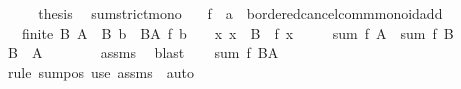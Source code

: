 \begin{isabellebody}
\ \ \isamarkupfalse%
\ \isamarkupfalse%
\ {\isacharquery}{\kern0pt}thesis\ \isacommand{{\isachardot}{\kern0pt}}\isamarkupfalse%
\isanewline
{}\isamarkupfalse%
%
\endisatagproof
{\isafoldproof}%
%
\isadelimproof
\isanewline
%
\endisadelimproof
\isanewline
{}\isamarkupfalse%
\ sum{\isacharunderscore}{\kern0pt}strict{\isacharunderscore}{\kern0pt}mono{}{\isacharcolon}{\kern0pt}\isanewline
\ \ \ f\ {\isacharcolon}{\kern0pt}{\isacharcolon}{\kern0pt}\ {\isachardoublequoteopen}{\isacharprime}{\kern0pt}a\ {\isasymRightarrow}\ {\isacharprime}{\kern0pt}b{\isacharcolon}{\kern0pt}{\isacharcolon}{\kern0pt}ordered{\isacharunderscore}{\kern0pt}cancel{\isacharunderscore}{\kern0pt}comm{\isacharunderscore}{\kern0pt}monoid{\isacharunderscore}{\kern0pt}add{\isachardoublequoteclose}\isanewline
\ \ \ {\isachardoublequoteopen}finite\ B{\isachardoublequoteclose}\ {\isachardoublequoteopen}A\ {\isasymsubseteq}\ B{\isachardoublequoteclose}\ {\isachardoublequoteopen}b\ {\isasymin}\ B{\isacharminus}{\kern0pt}A{\isachardoublequoteclose}\ {\isachardoublequoteopen}f\ b\ {\isachargreater}{\kern0pt}\ {}{\isachardoublequoteclose}\ \ {\isachardoublequoteopen}{\isasymAnd}x{\isachardot}{\kern0pt}\ x\ {\isasymin}\ B\ {\isasymLongrightarrow}\ f\ x\ {\isasymge}\ {}{\isachardoublequoteclose}\isanewline
\ \ \ {\isachardoublequoteopen}sum\ f\ A\ {\isacharless}{\kern0pt}\ sum\ f\ B{\isachardoublequoteclose}\isanewline
%
\isadelimproof
%
\endisadelimproof
%
\isatagproof
{}\isamarkupfalse%
\ {\isacharminus}{\kern0pt}\isanewline
\ \ \isamarkupfalse%
\ {\isachardoublequoteopen}B\ {\isacharminus}{\kern0pt}\ A\ {\isasymnoteq}\ {\isacharbraceleft}{\kern0pt}{\isacharbraceright}{\kern0pt}{\isachardoublequoteclose}\isanewline
\ \ \ \ \isamarkupfalse%
\ assms{\isacharparenleft}{\kern0pt}{}{\isacharparenright}{\kern0pt}\ \isamarkupfalse%
\ blast\isanewline
\ \ \isamarkupfalse%
\ {\isachardoublequoteopen}sum\ f\ {\isacharparenleft}{\kern0pt}B{\isacharminus}{\kern0pt}A{\isacharparenright}{\kern0pt}\ {\isachargreater}{\kern0pt}\ {}{\isachardoublequoteclose}\isanewline
\ \ \ \ \isamarkupfalse%
\ {\isacharparenleft}{\kern0pt}rule\ sum{\isacharunderscore}{\kern0pt}pos{}{\isacharparenright}{\kern0pt}\ {\isacharparenleft}{\kern0pt}use\ assms\ \ auto{\isacharparenright}{\kern0pt}\isanewline
\ \ \isamarkupfalse%

\end{isabellebody}
